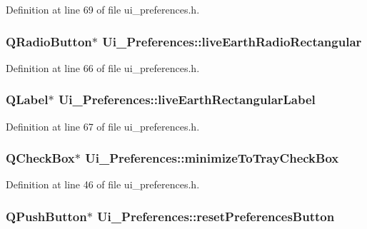 Definition at line 69 of file ui\_\-preferences.h.

\hypertarget{classUi__Preferences_ace264d1e3cdc0323fc42af478d237474}{
\subsubsection[{liveEarthRadioRectangular}]{\setlength{\rightskip}{0pt plus 5cm}QRadioButton$\ast$ {\bf Ui\_\-Preferences::liveEarthRadioRectangular}}}
\label{classUi__Preferences_ace264d1e3cdc0323fc42af478d237474}


Definition at line 66 of file ui\_\-preferences.h.

\hypertarget{classUi__Preferences_aecbe1aff951c2db302cafc5fa1a360d3}{
\subsubsection[{liveEarthRectangularLabel}]{\setlength{\rightskip}{0pt plus 5cm}QLabel$\ast$ {\bf Ui\_\-Preferences::liveEarthRectangularLabel}}}
\label{classUi__Preferences_aecbe1aff951c2db302cafc5fa1a360d3}


Definition at line 67 of file ui\_\-preferences.h.

\hypertarget{classUi__Preferences_aa58b4ebc358d2f12989ca10837fa90ea}{
\subsubsection[{minimizeToTrayCheckBox}]{\setlength{\rightskip}{0pt plus 5cm}QCheckBox$\ast$ {\bf Ui\_\-Preferences::minimizeToTrayCheckBox}}}
\label{classUi__Preferences_aa58b4ebc358d2f12989ca10837fa90ea}


Definition at line 46 of file ui\_\-preferences.h.

\hypertarget{classUi__Preferences_aa567cb947008e6d473f92fe94070d29b}{
\subsubsection[{resetPreferencesButton}]{\setlength{\rightskip}{0pt plus 5cm}QPushButton$\ast$ {\bf Ui\_\-Preferences::resetPreferencesButton}}}
\label{classUi__Preferences_aa567cb947008e6d473f92fe94070d29b}


